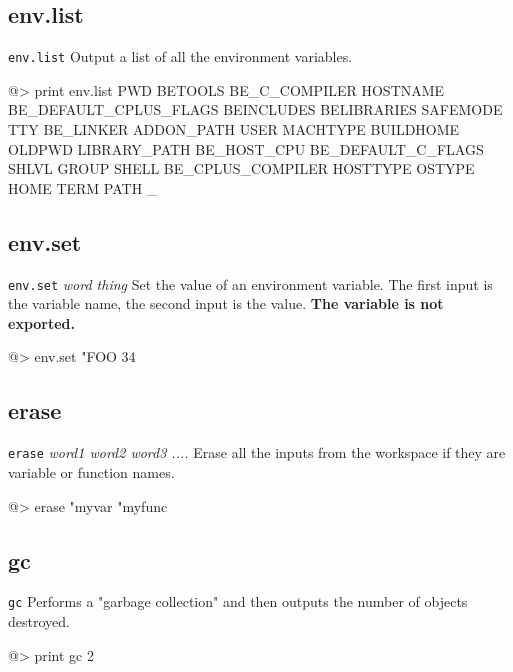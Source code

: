 \subsection*{env.list}  
 
{\tt env.list} 
\newline\newline
Output a list of all the environment variables.
\begin{verbatimtab} 
@> print env.list
PWD BETOOLS BE_C_COMPILER HOSTNAME BE_DEFAULT_CPLUS_FLAGS
BEINCLUDES BELIBRARIES SAFEMODE TTY BE_LINKER ADDON_PATH
USER MACHTYPE BUILDHOME OLDPWD LIBRARY_PATH BE_HOST_CPU
BE_DEFAULT_C_FLAGS SHLVL GROUP SHELL BE_CPLUS_COMPILER
HOSTTYPE OSTYPE HOME TERM PATH _
\end{verbatimtab}

\subsection*{env.set}  
 
{\tt env.set} {\it word thing}
\newline\newline
Set the value of an environment variable. The first input is the variable name, the second input is the value. {\bf The variable is not exported.}
\begin{verbatimtab} 
@> env.set "FOO 34
\end{verbatimtab}

\subsection*{erase}  
 
{\tt erase} {\it word1 word2 word3 ....} 
\newline\newline
Erase all the inputs from the workspace if they are variable or function names.
\begin{verbatimtab} 
@> erase "myvar "myfunc
\end{verbatimtab}

\subsection*{gc}  
 
{\tt gc}
\newline\newline
Performs a "garbage collection" and then outputs the number of objects destroyed.
\begin{verbatimtab} 
@> print gc
2
\end{verbatimtab}


